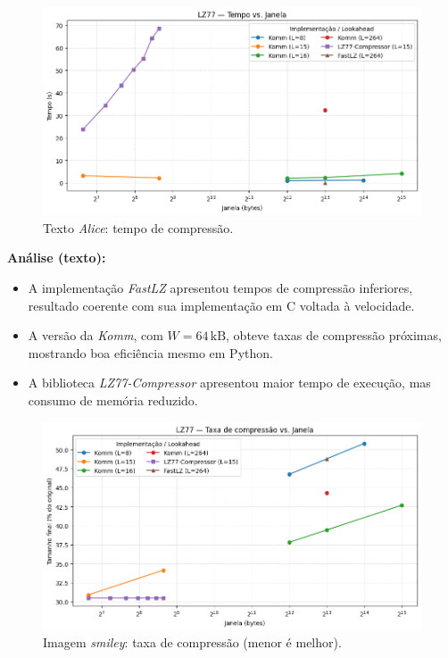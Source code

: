 \begin{figure}[htp]
  \centering
  \caption{Texto \textit{Alice}: tempo de compressão.}
  \label{fig:external-alice-time}
  \includegraphics[width=15cm]{figuras/lz77_alice_time_window.png}
\end{figure}

\noindent\textbf{Análise (texto):}
\begin{itemize}
  \item A implementação \textit{FastLZ} apresentou tempos de compressão inferiores, resultado coerente com sua implementação em C voltada à velocidade.
  \item A versão da \textit{Komm}, com \(W=64\,\text{kB}\), obteve taxas de compressão próximas, mostrando boa eficiência mesmo em Python.
  \item A biblioteca \textit{LZ77-Compressor} apresentou maior tempo de execução, mas consumo de memória reduzido.
\end{itemize}

\begin{figure}[htp]
  \centering
  \caption{Imagem \textit{smiley}: taxa de compressão (menor é melhor).}
  \label{fig:external-smiley-compression}
  \includegraphics[width=15cm]{figuras/lz77_smiley_compression_window.png}
\end{figure}

